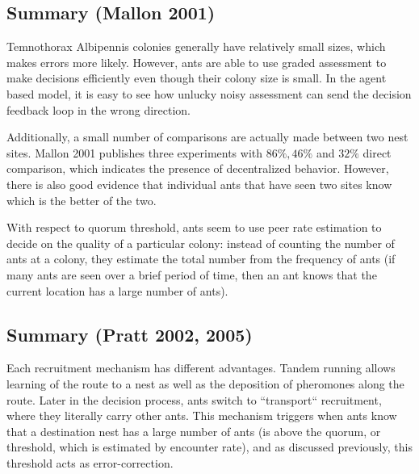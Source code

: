 \documentclass{article}
\makeatletter
\def\mcolor#1#{\@mcolor{#1}}
\def\@mcolor#1#2#3{%
  \protect\leavevmode
  \begingroup
    \color#1{#2}#3%
  \endgroup
}
\newcommand{\sitem}[1]
{
    \begin{itemize}
        \item #1
    \end{itemize}
}
\makeatother
\begin{document}
\subsection{Summary (Mallon 2001)}

Temnothorax Albipennis colonies generally have relatively small sizes, which makes errors more likely. However, ants are able to use graded assessment to make decisions efficiently even though their colony size is small. In the agent based model, it is easy to see how unlucky noisy assessment can send the decision feedback loop in the wrong direction.

Additionally, a small number of comparisons are actually made between two nest sites.
Mallon 2001 publishes three experiments with $86\%, 46\%$ and $32\%$ direct comparison, which indicates the presence of decentralized behavior.
However, there is also good evidence that individual ants that have seen two sites know which is the better of the two.

With respect to quorum threshold, ants seem to use peer rate estimation to decide on the quality of a particular colony: instead of counting the number of ants at a colony, they estimate the total number from the frequency of ants (if many ants are seen over a brief period of time, then an ant knows that the current location has a large number of ants).




\subsection{Summary (Pratt 2002, 2005)}

Each recruitment mechanism has different advantages. Tandem running allows learning of the route to a nest as well as the deposition of pheromones along the route. 
Later in the decision process, ants switch to ``transport`` recruitment, where they literally carry other ants. 
This mechanism triggers when ants know that a destination nest has a large number of ants (is above the quorum, or threshold, which is estimated by encounter rate), and as discussed previously, this threshold acts as error-correction.
\end{document}
